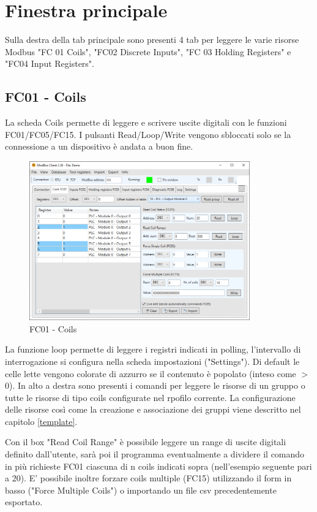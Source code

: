 
\chapter{Finestra principale}

Sulla destra della tab principale sono presenti 4 tab per leggere le varie risorse Modbus 
"FC 01 Coils", "FC02 Discrete Inputs", "FC 03 Holding Registers" e "FC04 Input Registers".

\section{FC01 - Coils}

La scheda Coils permette di leggere e scrivere uscite digitali con le funzioni FC01/FC05/FC15. I
pulsanti Read/Loop/Write vengono sbloccati solo se la connessione a un dispositivo è andata a
buon fine.

\begin{figure}[H]
\centering
\includegraphics[width=0.85\textwidth]{../Img/Modbus_Client_Coils_00.PNG}
\caption{FC01 - Coils}
\end{figure}

La funzione loop permette di leggere i registri indicati in polling, l'intervallo di interrogazione si
configura nella scheda impostazioni ("Settings"). 
Di default le celle lette vengono colorate di azzurro se il contenuto è popolato (inteso come $>$ 0).
In alto a destra sono presenti i comandi per leggere le risorse di un gruppo o tutte le risorse
di tipo coils configurate nel rpofilo corrente. La configurazione delle risorse così come la creazione e 
associazione dei gruppi viene descritto nel capitolo \ref{template}.

\newpage

Con il box "Read Coil Range" è possibile leggere un range di uscite digitali definito dall'utente,
sarà poi il programma eventualmente a dividere il comando in più richieste FC01 ciascuna di n coils
indicati sopra (nell'esempio seguente pari a 20). 
E' possibile inoltre forzare coils multiple (FC15) utilizzando il form in basso 
("Force Multiple Coils") o importando un file csv precedentemente esportato.

